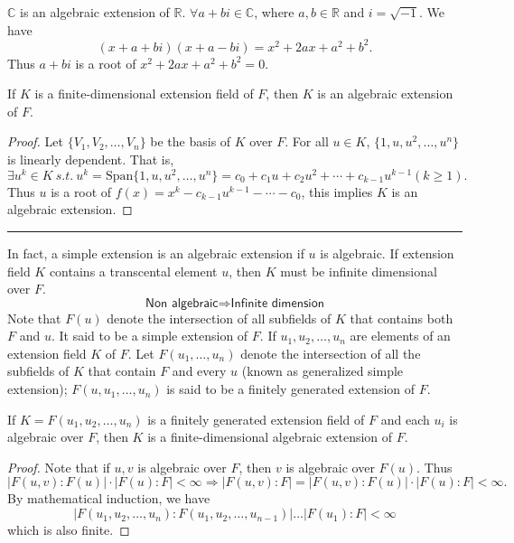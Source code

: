 \begin{example}
    $\mathbb{C}$ is an algebraic extension of $\mathbb{R}$. $\forall a+bi \in \mathbb{C}$, where 
    $a,b \in \mathbb{R}$ and $i = \sqrt{-1}$. We have 
    \[
        (x+a+bi)(x+a-bi) = x^2 +2ax + a^2 + b^2.
    \]
    Thus $a+bi$ is a root of $x^2 +2ax + a^2 + b^2 = 0$.
\end{example}

\begin{theorem}
    If $K$ is a finite-dimensional extension field of $F$, then $K$ is an algebraic extension of $F$.
\end{theorem}
\begin{proof}
    Let $\{ V_1, V_2, \ldots, V_n \}$ be the basis of $K$ over $F$. For all $u \in K$, 
    $\{ 1, u, u^2, \ldots, u^n \}$ is linearly dependent. That is, 
    \[
        \exists u^k \in K \> s.t. \> u^k = \text{Span} \{1, u, u^2, \ldots, u^n\} = c_0 + c_1 u + c_2 u^2 +
        \cdots + c_{k-1} u^{k-1} (k \geq 1).
    \]
    Thus $u$ is a root of $f(x) = x^k - c_{k-1} u^{k-1} - \cdots - c_0$, this implies $K$ is an algebraic extension.
\end{proof}

\hrule
\vspace{10pt}

In fact, a simple extension is an algebraic extension if $u$ is algebraic. If extension field $K$ contains a 
transcental element $u$, then $K$ must be infinite dimensional over $F$.
\[
    \textsf{Non algebraic} \Longrightarrow \textsf{Infinite dimension}
\]
Note that $F(u)$ denote the intersection of all subfields of $K$ that contains both $F$ and $u$. It said to be a simple 
extension of $F$. If $u_1, u_2, \ldots, u_n$ are elements of an extension field $K$ of $F$. Let 
$F(u_1, \ldots, u_n)$ denote the intersection of all the subfields of $K$ that contain $F$ and every $u$ (known as 
generalized simple extension); $F(u, u_1, \ldots, u_n)$ is said to be a finitely generated extension of $F$.

\begin{theorem}
    If $K = F(u_1, u_2, \ldots, u_n)$ is a finitely generated extension field of 
    $F$ and each $u_i$ is algebraic over $F$, then $K$ is a finite-dimensional algebraic extension of $F$.
\end{theorem}
\begin{proof}
    Note that if $u, v$ is algebraic over $F$, then $v$ is algebraic over $F(u)$. Thus
    \[
        |F(u,v) : F(u)|\cdot |F(u) : F| < \infty \Longrightarrow 
        |F(u,v) : F| = |F(u,v) : F(u)| \cdot |F(u) : F| < \infty.
    \]
    By mathematical induction, we have 
    \[
        |F(u_1, u_2, \ldots, u_n) : F(u_1, u_2, \ldots, u_{n-1})| \ldots 
        |F(u_1) : F| < \infty
    \]
    which is also finite.
\end{proof}

